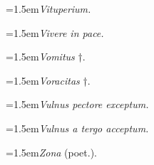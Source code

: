 \par{\dictfontsize\hangindent=1.5em\noindent \textit{Vituperium.} \par}
\par{\dictfontsize\hangindent=1.5em\noindent \textit{Vivere in pace.} \par}
\par{\dictfontsize\hangindent=1.5em\noindent \textit{Vomitus} †. \par}
\par{\dictfontsize\hangindent=1.5em\noindent \textit{Voracitas} †. \par}
\par{\dictfontsize\hangindent=1.5em\noindent \textit{Vulnus pectore exceptum.} \par}
\par{\dictfontsize\hangindent=1.5em\noindent \textit{Vulnus a tergo acceptum.} \par}
\par{\dictfontsize\hangindent=1.5em\noindent \textit{Zona} (poet.). \par}
